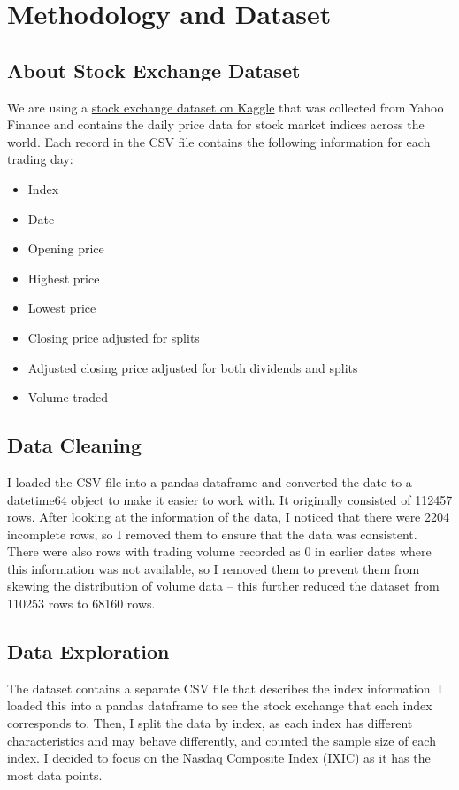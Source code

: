 \documentclass[a4paper, 11pt]{article}
\begin{document}
\section{Methodology and Dataset}

\subsection{About Stock Exchange Dataset}
We are using a \href{https://www.kaggle.com/datasets/mattiuzc/stock-exchange-data}{stock exchange dataset on Kaggle} that was collected from Yahoo Finance and contains the daily price data for stock market indices across the world. Each record in the CSV file contains the following information for each trading day:

\begin{itemize}
    \setlength\itemsep{0em}
    \item Index
    \item Date
    \item Opening price
    \item Highest price 
    \item Lowest price 
    \item Closing price adjusted for splits
    \item Adjusted closing price adjusted for both dividends and splits
    \item Volume traded 
\end{itemize}

\subsection{Data Cleaning}
I loaded the CSV file into a pandas dataframe and converted the date to a datetime64 object to make it easier to work with. It originally consisted of 112457 rows. After looking at the information of the data, I noticed that there were 2204 incomplete rows, so I removed them to ensure that the data was consistent. There were also rows with trading volume recorded as 0 in earlier dates where this information was not available, so I removed them to prevent them from skewing the distribution of volume data -- this further reduced the dataset from 110253 rows to 68160 rows.

\subsection{Data Exploration}
The dataset contains a separate CSV file that describes the index information. I loaded this into a pandas dataframe to see the stock exchange that each index corresponds to. Then, I split the data by index, as each index has different characteristics and may behave differently, and counted the sample size of each index. I decided to focus on the Nasdaq Composite Index (IXIC) as it has the most data points.
\end{document}
